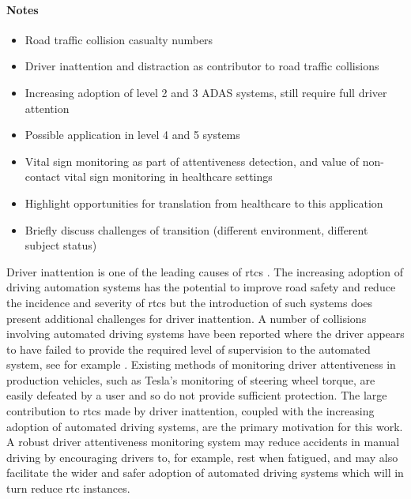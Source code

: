 \documentclass[11pt, parskip=half*,twoside=false]{scrbook}
\begin{document}
\paragraph{Notes}
\begin{itemize}
	\item Road traffic collision casualty numbers
	\item Driver inattention and distraction as contributor to road traffic collisions
	\item Increasing adoption of level 2 and 3 ADAS systems, still require full driver attention
	\item Possible application in level 4 and 5 systems
	\item Vital sign monitoring as part of attentiveness detection, and value of non-contact vital sign monitoring in healthcare settings
	\item Highlight opportunities for translation from healthcare to this application
	\item Briefly discuss challenges of transition (different environment, different subject status)
\end{itemize}

Driver inattention is one of the leading causes of \glspl{rtc} \citep{petridouHumanFactorsCausation2000,youngDriverDistraction2007,olsonDriverDistractionCommercial2009}. The increasing adoption of driving automation systems has the potential to improve road safety and reduce the incidence and severity of \glspl{rtc} \citep{favaroExaminingAccidentReports2017} but the introduction of such systems does present additional challenges for driver inattention. A number of collisions involving automated driving systems have been reported where the driver appears to have failed to provide the required level of supervision to the automated system, see for example \citep{ntsbCollisionSportUtility2019,ntsbCollisionCarOperating2019}. Existing methods of monitoring driver attentiveness in production vehicles, such as Tesla's monitoring of steering wheel torque, are easily defeated by a user and so do not provide sufficient protection. The large contribution to \glspl{rtc} made by driver inattention, coupled with the increasing adoption of automated driving systems, are the primary motivation for this work. A robust driver attentiveness monitoring system may reduce accidents in manual driving by encouraging drivers to, for example, rest when fatigued, and may also facilitate the wider and safer adoption of automated driving systems which will in turn reduce \gls{rtc} instances. 
\end{document}
